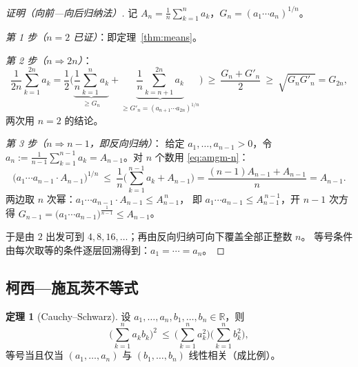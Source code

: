 \documentclass[11pt,a4paper]{ctexart}
\theoremstyle{definition}
\newtheorem{theorem}{定理}[section]
\theoremstyle{remark}
\newcommand{\R}{\mathbb{R}}
\begin{document}
\begin{proof}[证明（向前—向后归纳法）]
记 $A_n=\frac1n\sum_{k=1}^n a_k$，$G_n=(a_1\cdots a_n)^{1/n}$。

\emph{第 1 步（$n=2$ 已证）}：即定理~\ref{thm:means}。

\emph{第 2 步（$n\Rightarrow 2n$）}：
\[
  \frac{1}{2n}\sum_{k=1}^{2n}a_k
  =\frac{1}{2}\Big(\underbrace{\frac{1}{n}\sum_{k=1}^{n}a_k}_{\ge G_n}
              +\underbrace{\frac{1}{n}\sum_{k=n+1}^{2n}a_k}_{\ge G'_n=(a_{n+1}\cdots a_{2n})^{1/n}}\Big)
  \ \ge\ \frac{G_n+G'_n}{2}
  \ \ge\ \sqrt{G_nG'_n}=G_{2n},
\]
两次用 $n=2$ 的结论。

\emph{第 3 步（$n\Rightarrow n-1$，即反向归纳）}：
给定 $a_1,\dots,a_{n-1}>0$，令
$a_n:=\frac{1}{n-1}\sum_{k=1}^{n-1}a_k=A_{n-1}$。对 $n$ 个数用 \eqref{eq:amgm-n}：
\[
  \Big(a_1\cdots a_{n-1}\cdot A_{n-1}\Big)^{1/n}
  \ \le\ \frac{1}{n}\Big(\sum_{k=1}^{n-1}a_k+A_{n-1}\Big)
  =\frac{(n-1)A_{n-1}+A_{n-1}}{n}=A_{n-1}.
\]
两边取 $n$ 次幂：$a_1\cdots a_{n-1}\cdot A_{n-1}\le A_{n-1}^{\,n}$，
即 $a_1\cdots a_{n-1}\le A_{n-1}^{\,n-1}$，开 $n-1$ 次方得
$G_{n-1}=\big(a_1\cdots a_{n-1}\big)^{\frac{1}{n-1}}\le A_{n-1}$。

于是由 $2$ 出发可到 $4,8,16,\dots$；再由反向归纳可向下覆盖全部正整数 $n$。
等号条件由每次取等的条件逐层回溯得到：$a_1=\cdots=a_n$。
\end{proof}

\subsection{柯西—施瓦茨不等式}

\begin{theorem}[Cauchy–Schwarz]\label{thm:cs}
设 $a_1,\dots,a_n,b_1,\dots,b_n\in\R$，则
\begin{equation}\label{eq:cs}
  \Big(\sum_{k=1}^{n}a_kb_k\Big)^{2}
  \ \le\ \Big(\sum_{k=1}^{n}a_k^{2}\Big)\Big(\sum_{k=1}^{n}b_k^{2}\Big),
\end{equation}
等号当且仅当 $(a_1,\dots,a_n)$ 与 $(b_1,\dots,b_n)$ 线性相关（成比例）。
\end{theorem}
\end{document}
